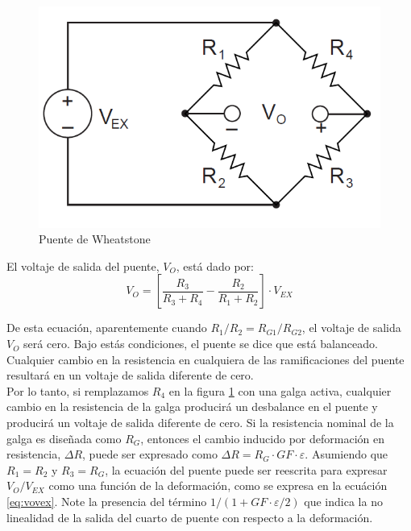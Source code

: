 \begin{figure}[!h]
\centering
\includegraphics[scale=0.45]{src/ch2/wheatstone_bridge.png}
\caption{Puente de Wheatstone}
\label{fig:wheatstone_bridge}
\end{figure}

El voltaje de salida del puente, $V_O$, está dado por: \\

\begin{equation}
V_O = \left[ \frac{R_3}{R_3 + R_4} - \frac{R_2}{R_1 + R_2} \right] \cdot V_{EX}
\end{equation}

De esta ecuación, aparentemente cuando $R_1/R_2 = R_{G1}/R_{G2}$, el voltaje de salida $V_O$ será cero. 
Bajo estás condiciones, el puente se dice que está balanceado. Cualquier cambio en la resistencia en 
cualquiera de las ramificaciones del puente resultará en un voltaje de salida diferente de cero. ~\cite{gageNI}\\

Por lo tanto, si remplazamos $R_4$ en la figura \ref{fig:wheatstone_bridge} con una galga activa, 
cualquier cambio en la resistencia de la galga producirá un desbalance en el puente y producirá 
un voltaje de salida diferente de cero. Si la resistencia nominal de la galga es diseñada como 
$R_G$, entonces el cambio inducido por deformación en resistencia, $\Delta R$, puede ser 
expresado como $\Delta R = R_G \cdot GF \cdot \varepsilon$. Asumiendo que $R_1 = R_2$ y 
$R_3 = R_G$, la ecuación del puente puede ser reescrita para expresar $V_O/V_{EX}$ como una 
función de la deformación, como se expresa en la ecuáción \ref{eq:vovex}. Note la presencia 
del término $1 / (1 + GF \cdot \varepsilon / 2)$ que indica la no linealidad de 
la salida del cuarto de puente con respecto a la deformación. ~\cite{gageNI} \\

